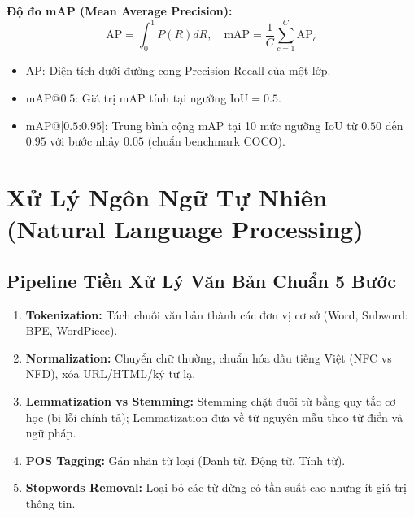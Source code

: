 \documentclass[10pt,a4paper]{article}
\begin{document}
\textbf{Độ đo mAP (Mean Average Precision):}
\begin{equation}
    \text{AP} = \int_0^1 P(R) dR, \quad \text{mAP} = \frac{1}{C} \sum_{c=1}^C \text{AP}_c
\end{equation}
\begin{itemize}[leftmargin=*]
    \item $\text{AP}$: Diện tích dưới đường cong Precision-Recall của một lớp.
    \item $\text{mAP@0.5}$: Giá trị mAP tính tại ngưỡng $\text{IoU} = 0.5$.
    \item $\text{mAP@[0.5:0.95]}$: Trung bình cộng mAP tại 10 mức ngưỡng IoU từ $0.50$ đến $0.95$ với bước nhảy $0.05$ (chuẩn benchmark COCO).
\end{itemize}

\section{Xử Lý Ngôn Ngữ Tự Nhiên (Natural Language Processing)}

\subsection{Pipeline Tiền Xử Lý Văn Bản Chuẩn 5 Bước}
\begin{enumerate}[leftmargin=*]
    \item \textbf{Tokenization:} Tách chuỗi văn bản thành các đơn vị cơ sở (Word, Subword: BPE, WordPiece).
    \item \textbf{Normalization:} Chuyển chữ thường, chuẩn hóa dấu tiếng Việt (NFC vs NFD), xóa URL/HTML/ký tự lạ.
    \item \textbf{Lemmatization vs Stemming:} Stemming chặt đuôi từ bằng quy tắc cơ học (bị lỗi chính tả); Lemmatization đưa về từ nguyên mẫu theo từ điển và ngữ pháp.
    \item \textbf{POS Tagging:} Gán nhãn từ loại (Danh từ, Động từ, Tính từ).
    \item \textbf{Stopwords Removal:} Loại bỏ các từ dừng có tần suất cao nhưng ít giá trị thông tin.
\end{enumerate}
\end{document}
